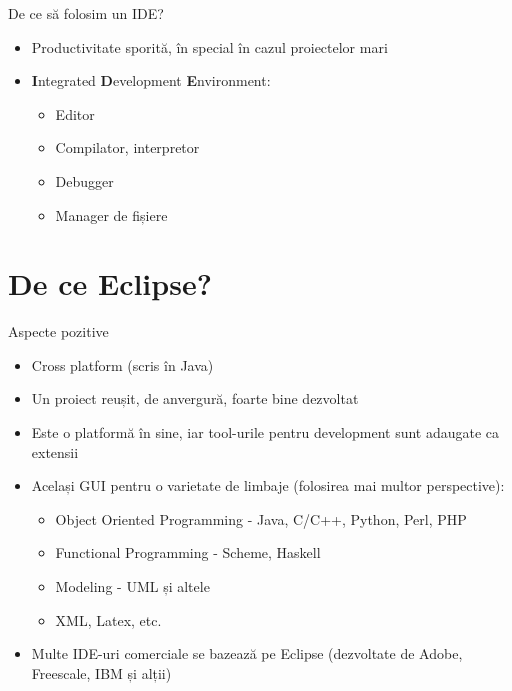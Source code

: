 \documentclass{beamer}
\begin{document}
\begin{frame}{De ce să folosim un IDE?}
  \begin{itemize}
  \pause
  \item Productivitate sporită, în special în cazul proiectelor mari
  \pause
  \item \textbf{I}ntegrated \textbf{D}evelopment \textbf{E}nvironment:
    \begin{itemize} 
    \pause
    \item Editor
    \pause
    \item Compilator, interpretor
    \pause
    \item Debugger
    \pause
    \item Manager de fișiere
    \end{itemize}
  \end{itemize}
\end{frame}

\section{De ce Eclipse?}

\begin{frame}{Aspecte pozitive}
  \begin{itemize}
  \pause
  \item Cross platform (scris în Java)
  \pause
  \item Un proiect reușit, de anvergură, foarte bine dezvoltat
  \pause
  \item Este o platformă în sine, iar tool-urile pentru development sunt adaugate ca extensii
  \pause
  \item Același GUI pentru o varietate de limbaje (folosirea mai multor perspective):
    \begin{itemize}
      \pause
      \item Object Oriented Programming - Java, C/C++, Python, Perl, PHP
      \pause
      \item Functional Programming -  Scheme, Haskell
      \pause
      \item Modeling - UML și altele
      \pause
      \item XML, Latex, etc.
      \pause
    \end{itemize}
  \item Multe IDE-uri comerciale se bazează pe Eclipse (dezvoltate de Adobe, Freescale, IBM și alții)
\end{itemize}
\end{frame}
\end{document}
